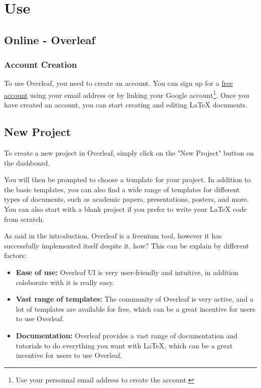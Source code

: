 \section{Use}
\subsection{Online - Overleaf}

\subsubsection{Account Creation}

To use Overleaf, you need to create an account. You can sign up for a \href{https://www.overleaf.com/register}{free account} using your email address or by linking your Google account\footnote{Use your personnal email address to create the account.}. Once you have created an account, you can start creating and editing LaTeX documents.

\subsection{New Project}

To create a new project in Overleaf, simply click on the "New Project" button on the dashboard.

You will then be prompted to choose a template for your project. In addition to the basic templates, you can also find a wide range of templates for different types of documents, such as academic papers, presentations, posters, and more. You can also start with a blank project if you prefer to write your LaTeX code from scratch.

As said in the introduction, Overleaf is a freenium tool, however it has successfully implemented itself despite it, how? This can be explain by different factors:
\begin{itemize} 
  \item \textbf{Ease of use:} Overleaf UI is very user-friendly and intuitive, in addition coloborate with it is really easy.
  \item \textbf{Vast range of templates:} The community of Overleaf is very active, and a lot of templates are available for free, which can be a great incentive for users to use Overleaf.
  \item \textbf{Documentation:} Overleaf provides a vast range of documentation and tutorials to do everything you want with LaTeX, which can be a great incentive for users to use Overleaf.
\end{itemize}

